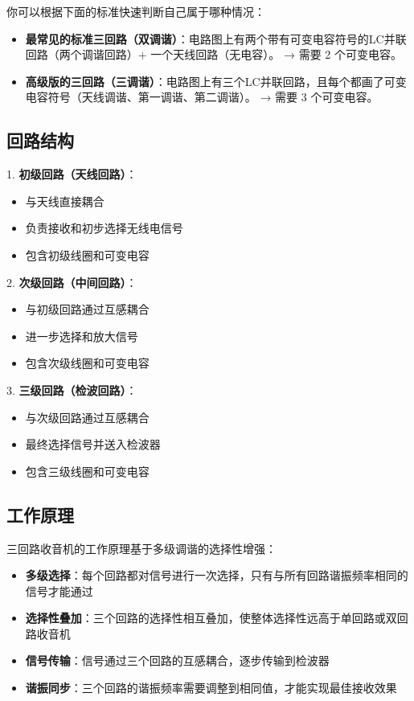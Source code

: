 \documentclass[12pt,UTF8]{ctexbook}
\begin{document}
你可以根据下面的标准快速判断自己属于哪种情况：

\begin{itemize}[leftmargin=3.5em]
	\item \textbf{最常见的标准三回路（双调谐）}：电路图上有两个带有可变电容符号的LC并联回路（两个调谐回路）+ 一个天线回路（无电容）。 → 需要 2 个可变电容。
	\item \textbf{高级版的三回路（三调谐）}：电路图上有三个LC并联回路，且每个都画了可变电容符号（天线调谐、第一调谐、第二调谐）。 → 需要 3 个可变电容。
\end{itemize}


\subsection{回路结构}

1. \textbf{初级回路（天线回路）}：
   \begin{itemize}[leftmargin=3.5em]
   \item 与天线直接耦合
   \item 负责接收和初步选择无线电信号
   \item 包含初级线圈和可变电容
   \end{itemize}

2. \textbf{次级回路（中间回路）}：
   \begin{itemize}[leftmargin=3.5em]
   \item 与初级回路通过互感耦合
   \item 进一步选择和放大信号
   \item 包含次级线圈和可变电容
   \end{itemize}

3. \textbf{三级回路（检波回路）}：
   \begin{itemize}[leftmargin=3.5em]
   \item 与次级回路通过互感耦合
   \item 最终选择信号并送入检波器
   \item 包含三级线圈和可变电容
   \end{itemize}

\subsection{工作原理}

三回路收音机的工作原理基于多级调谐的选择性增强：

\begin{itemize}[leftmargin=3.5em]
    \item \textbf{多级选择}：每个回路都对信号进行一次选择，只有与所有回路谐振频率相同的信号才能通过
    \item \textbf{选择性叠加}：三个回路的选择性相互叠加，使整体选择性远高于单回路或双回路收音机
    \item \textbf{信号传输}：信号通过三个回路的互感耦合，逐步传输到检波器
    \item \textbf{谐振同步}：三个回路的谐振频率需要调整到相同值，才能实现最佳接收效果
\end{itemize}
\end{document}
